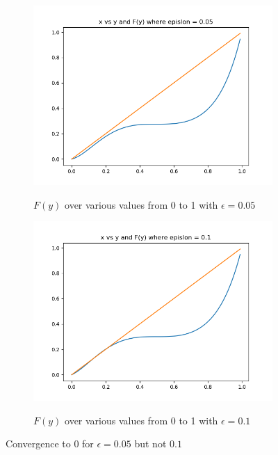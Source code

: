 \documentclass[12pt]{article}
\begin{document}
\begin{section}{5.1}
	\begin{figure}[H]
		\centering
		\begin{subfigure}{.5\textwidth}
			\centering
			\includegraphics[width=.8\linewidth]{epi0_05q51.png}
			\label{51d1}
			\caption{$F(y)$ over various values from 0 to 1 with $\epsilon = 0.05$}
		\end{subfigure}%
		\begin{subfigure}{.5\textwidth}
			\centering
			\includegraphics[width=.8\linewidth]{epi0_1q51.png}
			\label{51d2}
			\caption{$F(y)$ over various values from 0 to 1 with $\epsilon = 0.1$}
		\end{subfigure}
		\label{51d}
		\caption{Convergence to 0 for $\epsilon = 0.05$ but not $0.1$}
	\end{figure}
	
	
\end{section}
\end{document}
